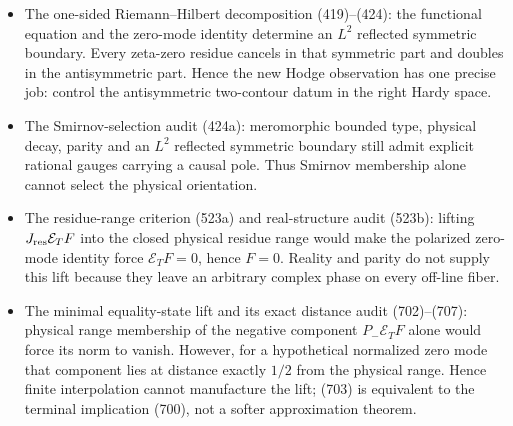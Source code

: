 \documentclass[11pt]{article}
\begin{document}
\begin{itemize}
      preventing a naive symmetric Gamma closure is the unsupertraced
      $\xi$-jump.  For a parity first-loss state the two arithmetic tails
      are reflections, so both are non-$L^2$ if the state is nonzero and a
      single one-sided compensated-current estimate is sufficient to close
      G40.
\item The one-sided Riemann--Hilbert decomposition (419)--(424): the
      functional equation and the zero-mode identity determine an $L^2$
      reflected symmetric boundary.  Every zeta-zero residue cancels in
      that symmetric part and doubles in the antisymmetric part.  Hence the
      new Hodge observation has one precise job: control the antisymmetric
      two-contour datum in the right Hardy space.
\item The Smirnov-selection audit (424a): meromorphic bounded type,
      physical decay, parity and an \(L^2\) reflected symmetric boundary
      still admit explicit rational gauges carrying a causal pole.  Thus
      Smirnov membership alone cannot select the physical orientation.
\item The residue-range criterion (523a) and real-structure audit (523b):
      lifting \(J_{\rm res}\mathcal E_TF\) into the closed physical residue
      range would make the polarized zero-mode identity force
      \(\mathcal E_TF=0\), hence \(F=0\).  Reality and parity do not supply
      this lift because they leave an arbitrary complex phase on every
      off-line fiber.
\item The minimal equality-state lift and its exact distance audit
      (702)--(707): physical range membership of the negative component
      \(P_-\mathcal E_TF\) alone would force its norm to vanish.  However,
      for a hypothetical normalized zero mode that component lies at
      distance exactly \(1/2\) from the physical range.  Hence finite
      interpolation cannot manufacture the lift; (703) is equivalent to
      the terminal implication (700), not a softer approximation theorem.
\end{itemize}
\end{document}
